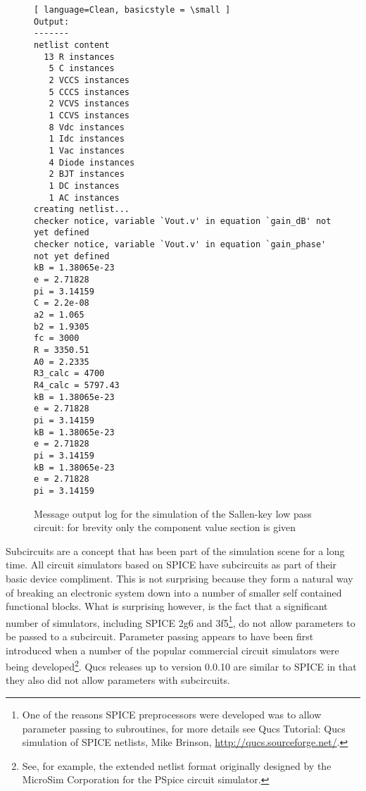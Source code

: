\begin{figure}
  \centering \begin{lstlisting}[ language=Clean, basicstyle = \small ]
Output:
-------
netlist content
  13 R instances
   5 C instances
   2 VCCS instances
   5 CCCS instances
   2 VCVS instances
   1 CCVS instances
   8 Vdc instances
   1 Idc instances
   1 Vac instances
   4 Diode instances
   2 BJT instances
   1 DC instances
   1 AC instances
creating netlist...
checker notice, variable `Vout.v' in equation `gain_dB' not yet defined
checker notice, variable `Vout.v' in equation `gain_phase' not yet defined
kB = 1.38065e-23
e = 2.71828
pi = 3.14159
C = 2.2e-08
a2 = 1.065
b2 = 1.9305
fc = 3000
R = 3350.51
A0 = 2.2335
R3_calc = 4700
R4_calc = 5797.43
kB = 1.38065e-23
e = 2.71828
pi = 3.14159
kB = 1.38065e-23
e = 2.71828
pi = 3.14159
kB = 1.38065e-23
e = 2.71828
pi = 3.14159
\end{lstlisting}

  \caption{Message output log for the simulation of the Sallen-key low pass circuit: for brevity only the component value section is given}
  \label{fig:equ_6}
\end{figure} 
 

Subcircuits are a concept that has been part of the simulation scene
for a long time. All circuit simulators based on SPICE have
subcircuits as part of their basic device compliment. This is not
surprising because they form a natural way of breaking an electronic
system down into a number of smaller self contained functional blocks.
What is surprising however, is the fact that a significant number of
simulators, including SPICE 2g6 and 3f5\footnote{One of the reasons
SPICE preprocessors were developed was to allow parameter passing to
subroutines, for more details see Qucs Tutorial: Qucs simulation of
SPICE netlists, Mike Brinson, \url{http://qucs.sourceforge.net/}.}, do
not allow parameters to be passed to a subcircuit.  Parameter passing
appears to have been first introduced when a number of the popular
commercial circuit simulators were being developed\footnote{See, for
example, the extended netlist format originally designed by the
MicroSim Corporation for the PSpice circuit simulator. }.  Qucs
releases up to version 0.0.10 are similar to SPICE in that they also
did not allow parameters with subcircuits.

